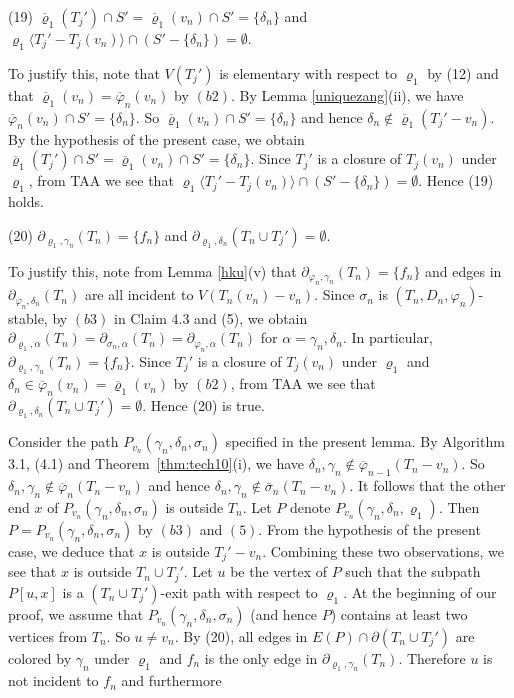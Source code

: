 \documentclass[11pt]{article}
\newcommand{\phibar}{\overline{\varphi}}
\newcommand{\phiv}{\varphi}
\begin{document}
\vskip 1mm
(19) $\overline{\varrho}_1 (T_j') \cap S'=\overline{\varrho}_1(v_n) \cap S'=\{\delta_n\}$ and $\varrho_1 \langle T_j' -T_j(v_n) \rangle \cap 
(S'-\{\delta_n\})=\emptyset$.

To justify this, note that $V(T_j')$ is elementary with respect to $\varrho_1$ by (12) and that
$\overline{\varrho}_1(v_n)=\phibar_n(v_n)$ by $(b2)$. By Lemma \ref{uniquezang}(ii), we have $\phibar_n(v_n) \cap  S'=
\{\delta_n\}$. So $\overline{\varrho}_1(v_n) \cap  S'=\{\delta_n\}$ and hence $\delta_n \notin \overline{\varrho}_1
(T_j'-v_n)$. By the hypothesis of the present case, we obtain $\overline{\varrho}_1 (T_j') \cap S'=\overline{\varrho}_1(v_n) \cap S'=\{\delta_n\}$. 
Since $T_j'$ is a closure of $T_{j}(v_n)$ under $\varrho_1$, from TAA we see that $\varrho_1 \langle T_j' -T_j(v_n) 
\rangle \cap (S'-\{\delta_n\})=\emptyset$. Hence (19) holds.

(20) $\partial_{\varrho_1, \gamma_n}(T_n)=\{f_n\}$ and $\partial_{\varrho_1, \delta_n}(T_n \cup T_j') =\emptyset$.

To justify this, note from Lemma \ref{hku}(v) that $\partial_{\varphi_n, \gamma_n}(T_n)=\{f_n\}$ and edges in $\partial_{\varphi_n, \delta_n}(T_n)$
are all incident to $V(T_n(v_n)-v_n)$. Since $\sigma_n$ is $(T_n, D_n, \phiv_n)$-stable, by $(b3)$ in Claim 4.3 and (5), we obtain 
$\partial_{\varrho_1, \alpha}(T_n)=\partial_{\sigma_n, \alpha}(T_n)=\partial_{\varphi_n, \alpha}(T_n)$ for $\alpha=\gamma_n, 
\delta_n$. In particular, $\partial_{\varrho_1, \gamma_n}(T_n)=\{f_n\}$. Since $T_j'$ is a closure of $T_j(v_n)$ under $\varrho_1$ and 
$\delta_n \in \phibar_n(v_n)=\overline{\varrho}_1(v_n)$ by $(b2)$, from TAA we see that $\partial_{\varrho_1, \delta_n}(T_n \cup T_j') =\emptyset$. 
Hence (20) is true.

\vskip 3mm
Consider the path $P_{v_n}(\gamma_n, \delta_n, \sigma_n)$ specified in the present lemma. By Algorithm 3.1, (4.1) and Theorem~\ref{thm:tech10}(i), 
we have $\delta_n, \gamma_n \notin \overline{\varphi}_{n-1}(T_n-v_n)$. So $\delta_n, \gamma_n \notin \overline{\varphi}_n(T_n-v_n)$ and hence
$\delta_n, \gamma_n \notin \overline{\sigma}_n(T_n-v_n)$.  It follows that the other end $x$ of $P_{v_n}(\gamma_n, \delta_n, \sigma_n)$ 
is outside $T_n$. Let $P$ denote $P_{v_n}(\gamma_n, \delta_n, \varrho_1)$. Then $P=P_{v_n}(\gamma_n, \delta_n, \sigma_n)$
by $(b3)$ and $(5)$. From the hypothesis of the present case, we deduce that $x$ is outside $T_j'-v_n$. Combining these two observations,
we see that $x$ is outside $T_n \cup T_j'$. Let $u$ be the vertex of $P$ such that the subpath $P[u,x]$ is a
$(T_n \cup T_j')$-exit path with respect to $\varrho_1$. At the beginning of our proof, we assume that $P_{v_n}(\gamma_n, \delta_n, \sigma_n)$
(and hence $P$) contains at least two vertices from $T_n$. So $u\ne v_n$. By (20), all edges in $E(P) \cap \partial(T_n \cup T_j')$ are colored 
by $\gamma_n$ under $\varrho_1$ and $f_n$ is the only edge in $\partial_{\varrho_1, \gamma_n}(T_n)$. Therefore $u$ is not incident to $f_n$ and furthermore
\end{document}
